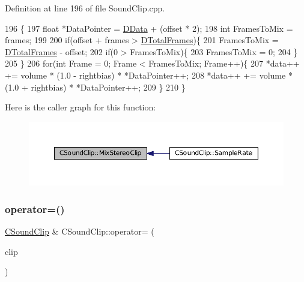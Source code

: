 Definition at line 196 of file Sound\+Clip.\+cpp.


\begin{DoxyCode}
196                                                                                                 \{
197     \textcolor{keywordtype}{float} *DataPointer = \hyperlink{classCSoundClip_a220921a0c81e5c63e2cd3c55c75878b1}{DData} + (offset * 2);
198     \textcolor{keywordtype}{int} FramesToMix = frames;
199     
200     \textcolor{keywordflow}{if}(offset + frames > \hyperlink{classCSoundClip_ab0d9eb261d09fa2a106658276f37285b}{DTotalFrames})\{
201         FramesToMix = \hyperlink{classCSoundClip_ab0d9eb261d09fa2a106658276f37285b}{DTotalFrames} - offset;
202         \textcolor{keywordflow}{if}(0 > FramesToMix)\{
203             FramesToMix = 0;
204         \}
205     \}
206     \textcolor{keywordflow}{for}(\textcolor{keywordtype}{int} Frame = 0; Frame < FramesToMix; Frame++)\{
207         *data++ += volume * (1.0 - rightbias) * *DataPointer++;
208         *data++ += volume * (1.0 + rightbias) * *DataPointer++;
209     \}
210 \}
\end{DoxyCode}
Here is the caller graph for this function\+:\nopagebreak
\begin{figure}[H]
\begin{center}
\leavevmode
\includegraphics[width=350pt]{classCSoundClip_a54fb05ee6936503af55650b10c861967_icgraph}
\end{center}
\end{figure}
\hypertarget{classCSoundClip_a4ab9ebe61c3b5ee9545e1167e53faeb3}{}\label{classCSoundClip_a4ab9ebe61c3b5ee9545e1167e53faeb3} 
\subsubsection{\texorpdfstring{operator=()}{operator=()}}
{\footnotesize\ttfamily \hyperlink{classCSoundClip}{C\+Sound\+Clip} \& C\+Sound\+Clip\+::operator= (\begin{DoxyParamCaption}\item[{const \hyperlink{classCSoundClip}{C\+Sound\+Clip} \&}]{clip }\end{DoxyParamCaption})}




